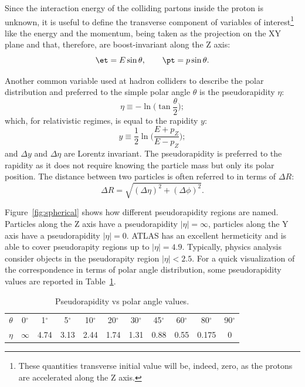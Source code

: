 Since the interaction energy of the colliding partons inside
the proton is unknown, it is useful to define the transverse component of variables of 
interest\footnote{These quantities transverse initial 
value will be, indeed, zero, as the protons are accelerated along the Z axis.}  
like the energy and the momentum, being taken as the projection on the XY plane
and that, therefore, are boost-invariant along the Z axis:
\begin{equation}\label{eq:transv}
\et = E\sin\theta, \qquad \pt = p\sin\theta.
	\end{equation}

Another common variable used at hadron colliders to describe the polar distribution and preferred to the simple
polar angle $\theta$ is the pseudorapidity $\eta$:
\begin{equation}\label{eq:pseudorapidity}
        \eta \equiv -\ln\bigg(\tan\frac{\theta}{2}\bigg);
	\end{equation}
which, for relativistic regimes, is equal to the rapidity $y$:
\begin{equation}\label{eq:rapidity}
y \equiv \frac{1}{2} \ln \bigg(\frac{E+p_{Z}}{E-p_{Z}}\bigg);
	\end{equation}
and $\Delta y$ and $\Delta \eta$ are Lorentz invariant. The pseudorapidity is preferred
to the rapidity as it does not require knowing the particle mass but only its polar position.
The distance between two particles is often referred to in terms of $\Delta R$:
\begin{equation}\label{eq:deltar}
\Delta R = \sqrt{(\Delta\eta)^{2} + (\Delta\phi)^{2}}.
	\end{equation}


Figure~\ref{fig:spherical} shows how different pseudorapidity regions are named. Particles
along the Z axis have a pseudorapidity $|\eta|=\infty$, particles along the Y axis have
a pseudorapidity $|\eta|=0$. ATLAS has an excellent hermeticity and is able to cover 
pseudorapity regions up to $|\eta|=4.9$. Typically, physics analysis consider objects in
the pseudorapity region  $|\eta|<2.5$. For a quick visualization of the correspondence
in terms of polar angle distribution, some pseudorapidity values are reported in Table~\ref{tab:etatheta}.


\begin{table}[htb]\centering\begin{tabular}{ccccccccccc}\toprule
$\theta$ & 0$^{\circ}$ & 1$^{\circ}$ & 5$^{\circ}$ & 10$^{\circ}$ & 20$^{\circ}$ & 30$^{\circ}$ & 45$^{\circ}$ & 60$^{\circ}$ & 80$^{\circ}$ & 90$^{\circ}$ \\
$\eta$ & $\infty$ & 4.74 & 3.13 & 2.44 & 1.74 & 1.31 & 0.88 & 0.55 & 0.175 & 0\\\bottomrule \end{tabular}
\caption{Pseudorapidity vs polar angle values.}\label{tab:etatheta}\end{table}

